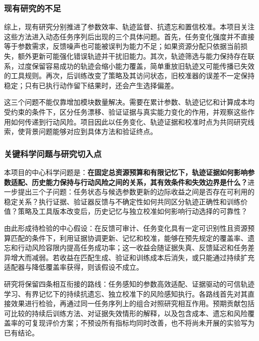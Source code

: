 \subsubsection{现有研究的不足}

综上，现有研究分别推进了参数效率、轨迹监督、抗遗忘和置信校准。本项目关注这些方法进入动态任务序列后出现的三个具体问题。首先，任务变化强度并不直接等于参数需求，反馈噪声也可能被误判为能力不足；如果资源分配只依据当前损失，额外更新可能强化错误轨迹并干扰旧能力。其次，轨迹筛选与能力保持存在联系，过度保留容易成功的轨迹会缩小能力覆盖，简单重放旧轨迹又可能传播已失效的工具规则。再次，后训练改变了策略及其访问状态，旧校准器的误差不一定保持稳定；只有已执行动作留下结果时，还会产生选择偏差。

这三个问题不能仅靠增加模块数量解决。需要在累计参数、轨迹记忆和计算成本均受约束的条件下，区分任务漂移、验证证据与真实能力变化的作用，并观察这些作用如何传递到行动风险。项目因此以任务变化、轨迹证据和校准时点为共同研究线索，使背景问题能够对应到具体方法和验证终点。

\subsubsection{关键科学问题与研究切入点}

本项目的中心科学问题是：\textbf{在固定总资源预算和有限记忆下，轨迹证据如何影响参数适配、历史能力保持与行动风险之间的关系，其有效条件和失效边界是什么？}进一步提出三个子问题：任务状态与候选参数更新的边际收益之间是否存在可利用的稳定关系？执行证据、验证器反馈与不确定性如何共同区分轨迹正确性和训练价值？策略及工具版本改变后，历史记忆与独立校准如何影响行动选择的可靠性？

由此形成待检验的中心假设：在反馈可审计、任务变化具有一定可识别性且资源预算匹配的条件下，利用证据协调更新、记忆和校准，能够在预先规定的覆盖率、遗忘和行动风险容限内提高任务成功率；这一收益会随证据失真、反馈延迟和任务差异增大而减弱。若收益在匹配生成、验证和训练成本后消失，或只能通过持续扩充适配器与降低覆盖率获得，则该假设不成立。

研究将保留四条相互衔接的路线：任务感知的参数高效适配、证据驱动的可信轨迹学习、有界记忆下的持续抗遗忘、独立校准下的风险感知执行。各路线首先对其直接效果进行检验，再通过同一任务序列上的组合对照研究相互作用。预期贡献包括可比较的持续后训练方法、对证据失效情形的解释，以及包含成本、遗忘和风险覆盖率的可复现评价方案；不预设所有指标均同时改善，也不将尚未开展的实验写为已有结论。
